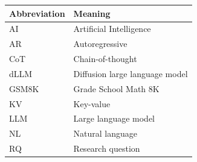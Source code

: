 \begin{tabular}{@{}ll@{}}
\toprule
\textbf{Abbreviation} & \textbf{Meaning} \\
\midrule
AI & Artificial Intelligence \\
AR & Autoregressive \\
CoT & Chain-of-thought \\
dLLM & Diffusion large language model \\
GSM8K & Grade School Math 8K \\
KV & Key-value \\
LLM & Large language model \\
NL & Natural language \\
RQ & Research question \\
\bottomrule
\end{tabular}
